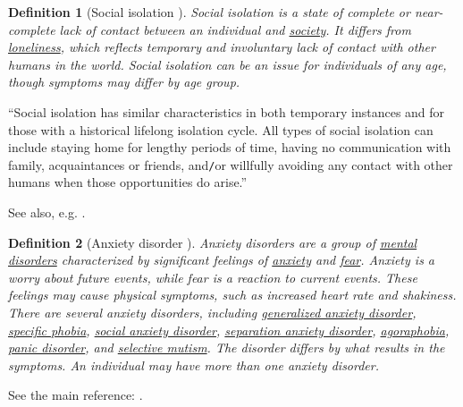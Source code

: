 \documentclass[12pt]{article}
\numberwithin{equation}{section}
\newtheorem{definition}{Definition}[section]
\begin{document}
\begin{definition}[Social isolation \cite{Wikipedia/Social isolation}]
    \emph{Social isolation} is a state of complete or near-complete lack of contact between an individual and \href{https://en.wikipedia.org/wiki/Society}{society}. It differs from \href{https://en.wikipedia.org/wiki/Loneliness}{loneliness}, which reflects temporary and involuntary lack of contact with other humans in the world. Social isolation can be an issue for individuals of any age, though symptoms may differ by age group.
\end{definition}
``Social isolation has similar characteristics in both temporary instances and for those with a historical lifelong isolation cycle. All types of social isolation can include staying home for lengthy periods of time, having no communication with family, acquaintances or friends, and\texttt{/}or willfully avoiding any contact with other humans when those opportunities do arise.''

See also, e.g. \cite{NASEM2020,NhuTrang2020}.

\begin{definition}[Anxiety disorder \cite{Wikipedia/Anxiety disorder}]
    \emph{Anxiety disorders} are a group of \href{https://en.wikipedia.org/wiki/Mental_disorder}{mental disorders} characterized by significant feelings of \href{https://en.wikipedia.org/wiki/Anxiety_(mood)}{anxiety} and \href{https://en.wikipedia.org/wiki/Fear}{fear}. Anxiety is a worry about future events, while fear is a reaction to current events. These feelings may cause physical symptoms, such as increased heart rate and shakiness. There are several anxiety disorders, including \href{https://en.wikipedia.org/wiki/Generalized_anxiety_disorder}{generalized anxiety disorder}, \href{https://en.wikipedia.org/wiki/Specific_phobia}{specific phobia}, \href{https://en.wikipedia.org/wiki/Social_anxiety_disorder}{social anxiety disorder}, \href{https://en.wikipedia.org/wiki/Separation_anxiety_disorder}{separation anxiety disorder}, \href{https://en.wikipedia.org/wiki/Agoraphobia}{agoraphobia}, \href{https://en.wikipedia.org/wiki/Panic_disorder}{panic disorder}, and \href{https://en.wikipedia.org/wiki/Selective_mutism}{selective mutism}. The disorder differs by what results in the symptoms. An individual may have more than one anxiety disorder.
\end{definition}
See the main reference: \cite{APA2013}.
\end{document}
